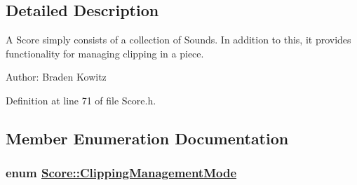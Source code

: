 \subsection{Detailed Description}
A Score simply consists of a collection of Sounds. In addition to this, it provides functionality for managing clipping in a piece. \begin{Desc}
\item[Author:]Braden Kowitz \end{Desc}




Definition at line 71 of file Score.h.

\subsection{Member Enumeration Documentation}
\hypertarget{classScore_w6}{
\subsubsection[ClippingManagementMode]{\setlength{\rightskip}{0pt plus 5cm}enum \hyperlink{classScore_w6}{Score::Clipping\-Management\-Mode}}}
\label{classScore_w6}


